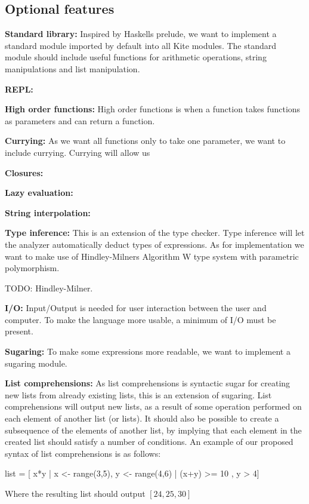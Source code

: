 \subsection{Optional features}

\textbf{Standard library:} Inspired by Haskells prelude, we want to
implement a standard module imported by default into all Kite
modules. The standard module should include useful functions for
arithmetic operations, string manipulations and list manipulation.

\textbf{REPL:}

\textbf{High order functions:} High order functions is when a
function takes functions as parameters and can return a function.


\textbf{Currying:} As we want all functions only to take one
parameter, we want to include currying. Currying will allow us 

\textbf{Closures:} 

\textbf{Lazy evaluation:} 

\textbf{String interpolation:}

\textbf{Type inference:} This is an extension of the type
checker. Type inference will let the analyzer automatically deduct
types of expressions. As for implementation we want to make use of
Hindley-Milners Algorithm W type system with parametric polymorphism.

TODO: Hindley-Milner.

\textbf{I/O:} Input/Output is needed for user interaction between the
user and computer. To make the language more usable, a minimum of I/O
must be present.

\textbf{Sugaring:} To make some expressions more readable, we want to
implement a sugaring module.

\textbf{List comprehensions:} As list comprehensions is syntactic
sugar for creating new lists from already existing lists, this is an
extension of sugaring. List comprehensions will output new lists, as a
result of some operation performed on each element of another list (or
lists). It should also be possible to create a subsequence of the
elements of another list, by implying that each element in the created
list should satisfy a number of conditions.
An example of our proposed syntax of list comprehensions is as
follows:
\begin{pseudo}
  
list = [ x*y | x <- range(3,5), y <- range(4,6) | (x+y) >= 10 , y > 4]
\end{pseudo}
Where the resulting list should output $[ 24, 25, 30 ]$

